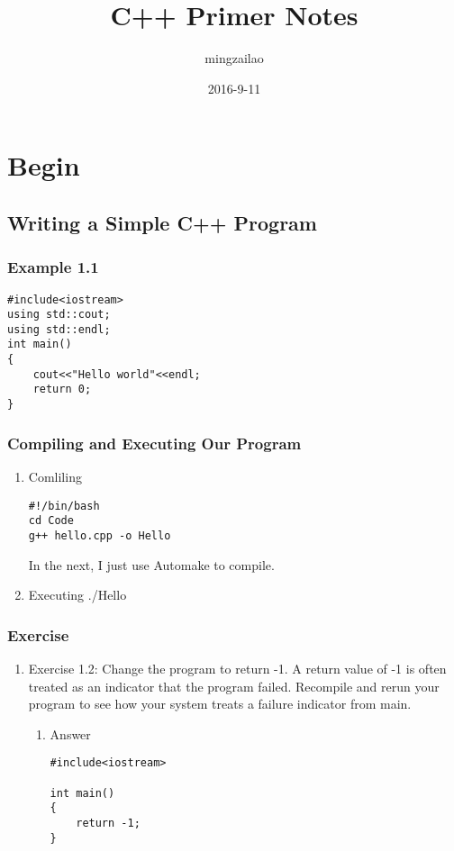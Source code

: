 \documentclass[11pt]{article}
\author{mingzailao}
\date{2016-9-11}
\title{C++ Primer Notes}
\begin{document}
\maketitle
\tableofcontents

\section{Begin}
\label{sec-1}
\subsection{Writing a Simple C++ Program}
\label{sec-1-1}
\subsubsection{Example 1.1}
\label{sec-1-1-1}
\begin{verbatim}
#include<iostream>
using std::cout;
using std::endl;
int main()
{
    cout<<"Hello world"<<endl;
    return 0;
}
\end{verbatim}
\subsubsection{Compiling and Executing Our Program}
\label{sec-1-1-2}
\begin{enumerate}
\item Comliling
\label{sec-1-1-2-1}
\begin{verbatim}
#!/bin/bash
cd Code
g++ hello.cpp -o Hello
\end{verbatim}
In the next, I just use Automake to compile.

\item Executing
\label{sec-1-1-2-2}
./Hello
\end{enumerate}
\subsubsection{Exercise}
\label{sec-1-1-3}
\begin{enumerate}
\item Exercise 1.2: Change the program to return -1. A return value of -1 is often treated as an indicator that the program failed. Recompile and rerun your program to see how your system treats a failure indicator from main.
\label{sec-1-1-3-1}
\begin{enumerate}
\item Answer
\label{sec-1-1-3-1-1}
\begin{verbatim}
#include<iostream>

int main()
{
    return -1;
}
\end{verbatim}
\end{enumerate}
\end{enumerate}
\end{document}

